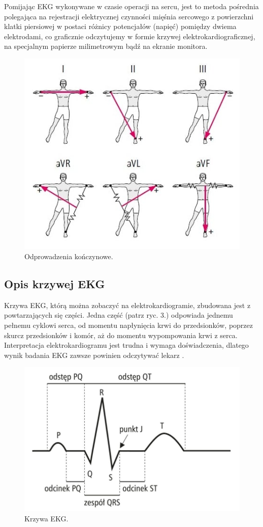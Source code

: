 \documentclass[12pt,a4paper]{article}
\begin{document}
Pomijając EKG wykonywane w czasie operacji na sercu, jest to metoda pośrednia polegająca na rejestracji elektrycznej czynności mięśnia sercowego z powierzchni klatki piersiowej w postaci różnicy potencjałów (napięć) pomiędzy dwiema elektrodami, co graficznie odczytujemy w formie krzywej elektrokardiograficznej, na specjalnym papierze milimetrowym bądź na ekranie monitora.

\begin{figure}[h]
    \centering
    \includegraphics[width=0.75\linewidth]{images/ekg_odprowadzenia.jpg}
    \caption{Odprowadzenia kończynowe. \cite{ekg-odprowadzenia-konczynowe}}
\end{figure}

\subsection{Opis krzywej EKG}
Krzywa EKG, którą można zobaczyć na elektrokardiogramie, zbudowana jest z powtarzających się części. Jedna część (patrz ryc. 3.) odpowiada jednemu pełnemu cyklowi serca, od momentu napłynięcia krwi do przedsionków, poprzez skurcz przedsionków i komór, aż do momentu wypompowania krwi z serca. Interpretacja elektrokardiogramu jest trudna i wymaga doświadczenia, dlatego wynik badania EKG zawsze powinien odczytywać lekarz \cite{czym-jest-ekg-mp-pl}.

\begin{figure}[h]
    \centering
    \includegraphics[width=0.75\linewidth]{images/krzywa-ekg.jpg}
    \caption{Krzywa EKG. \cite{ekg-analiza}}
\end{figure}
\end{document}
